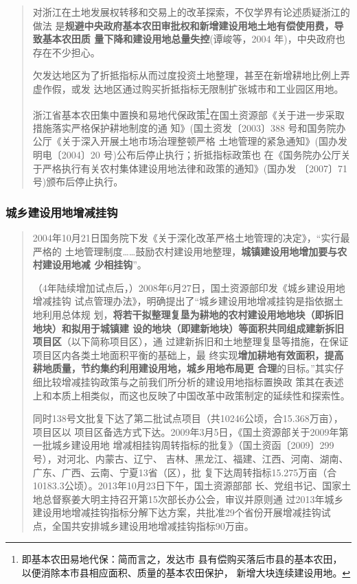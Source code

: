 \begin{quotation}
  对浙江在土地发展权转移和交易上的改革探索，不仅学界有论述质疑浙江的做法
  是\textbf{规避中央政府基本农田审批权和新增建设用地土地有偿使用费，导致基本农田质
    量下降和建设用地总量失控}(谭峻等，2004 年)，中央政府也存在不少担心。

  欠发达地区为了折抵指标从而过度投资土地整理，甚至在新增耕地比例上弄虚作假，或发
  达地区通过购买折抵指标无限制扩张城市和工业园区用地。

  浙江省基本农田集中置换和易地代保政策\footnote{即基本农田易地代保：简而言之，发达市
    县有偿购买落后市县的基本农田，以便消除本市县相应面积、质量的基本农田保护，
    新增大块连续建设用地。}在国土资源部《关于进一步采取措施落实严格保护耕地制度的通
  知》(国土资发〔2003〕388 号和国务院办公厅《关于深入开展土地市场治理整顿严格
  土地管理的紧急通知》(国办发明电〔2004〕20 号)公布后停止执行；折抵指标政策也
  在《国务院办公厅关于严格执行有关农村集体建设用地法律和政策的通知》(国办发
  〔2007〕71 号)颁布后停止执行。\cite{wangzhejiang}
\end{quotation}



\subsubsection{城乡建设用地增减挂钩}

\begin{quotation}
  2004年10月21日国务院下发《关于深化改革严格土地管理的决定》，“实行最严格的
  土地管理制度……鼓励农村建设用地整理，\textbf{城镇建设用地增加要与农村建设用地减
    少相挂钩}”。

  （4年陆续增加试点后，）2008年6月27日，国土资源部印发《城乡建设用地增减挂钩
  试点管理办法》，明确提出了“城乡建设用地增减挂钩是指依据土地利用总体规
  划，\textbf{将若干拟整理复垦为耕地的农村建设用地地块（即拆旧地块）和拟用于城镇建
    设的地块（即建新地块）等面积共同组成建新拆旧项目区}（以下简称项目区），通
  过建新拆旧和土地整理复垦等措施，在保证项目区内各类土地面积平衡的基础上，最
  终实现\textbf{增加耕地有效面积，提高耕地质量，节约集约利用建设用地，城乡用地布局更
  合理}的目标。”其实仔细比较增减挂钩政策与之前我们所分析的建设用地指标置换政
  策其在表述上和本质上相类似，而这也反映了中国改革中政策制定的延续性和探索性。

  同时138号文批复下达了第二批试点项目（共10246公顷，合15.368万亩），项目区以
  项目区备选方式下达。2009年3月5日，《国土资源部关于2009年第一批城乡建设用地
  增减相挂钩周转指标的批复》（国土资函〔2009〕299号），对河北、内蒙古、辽宁、
  吉林、黑龙江、福建、江西、河南、湖南、广东、广西、云南、宁夏13省（区），批
  复下达周转指标15.275万亩（合10183.3公顷）。2013年10月23日下午，国土资源部部
  长、党组书记、国家土地总督察姜大明主持召开第15次部长办公会，审议并原则通
  过2013年城乡建设用地增减挂钩指标分解下达方案，共批准29个省份开展增减挂钩试
  点，全国共安排城乡建设用地增减挂钩指标90万亩。\cite{yangdi}
\end{quotation}


